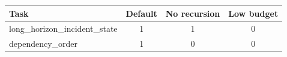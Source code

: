 \begin{tabular}{lccc}
\toprule
Task & Default & No recursion & Low budget \\
\midrule
long\_horizon\_incident\_state & 1 & 1 & 0 \\
dependency\_order & 1 & 0 & 0 \\
\bottomrule
\end{tabular}
